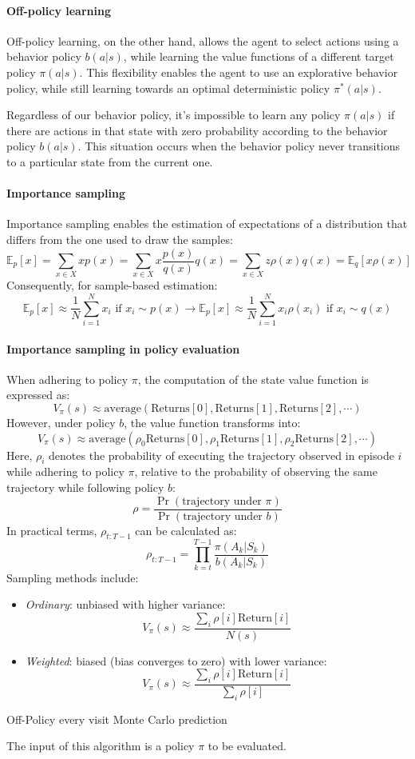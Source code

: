 \paragraph*{Off-policy learning}
Off-policy learning, on the other hand, allows the agent to select actions using a behavior policy $b(a|s)$, while learning the value functions of a different target policy $\pi(a|s)$. 
This flexibility enables the agent to use an explorative behavior policy, while still learning towards an optimal deterministic policy $\pi^\ast(a|s)$.

Regardless of our behavior policy, it's impossible to learn any policy $\pi(a|s)$ if there are actions in that state with zero probability according to the behavior policy $b(a|s)$. 
This situation occurs when the behavior policy never transitions to a particular state from the current one.

\paragraph*{Importance sampling}
Importance sampling enables the estimation of expectations of a distribution that differs from the one used to draw the samples:
\[\mathbb{E}_p[x]=\sum_{x\in X}xp(x)=\sum_{x\in X}x\dfrac{p(x)}{q(x)}q(x)=\sum_{x\in X}z\rho(x)q(x)=\mathbb{E}_q[x\rho(x)]\]
Consequently, for sample-based estimation:
\[\mathbb{E}_p[x]\approx\dfrac{1}{N}\sum_{i=1}^{N}x_i\text{ if }x_i\sim p(x)\rightarrow \mathbb{E}_p[x]\approx\dfrac{1}{N}\sum_{i=1}^{N}x_i\rho(x_i)\text{ if }x_i\sim q(x)\]

\paragraph*{Importance sampling in policy evaluation}
When adhering to policy $\pi$, the computation of the state value function is expressed as:
\[V_{\pi}(s)\approx\text{average}(\text{Returns}[0],\text{Returns}[1],\text{Returns}[2],\cdots)\]
However, under policy $b$, the value function transforms into:
\[V_{\pi}(s)\approx\text{average}(\rho_0\text{Returns}[0],\rho_1\text{Returns}[1],\rho_2\text{Returns}[2],\cdots)\]
Here, $\rho_i$ denotes the probability of executing the trajectory observed in episode $i$ while adhering to policy $\pi$, relative to the probability of observing the same trajectory while following policy $b$:
\[\rho=\dfrac{\Pr(\text{trajectory under }\pi)}{\Pr(\text{trajectory under }b)}\]
In practical terms, $\rho_{t:T-1}$ can be calculated as:
\[\rho_{t:T-1}=\prod_{k=t}^{T-1}\dfrac{\pi(A_k|S_k)}{b(A_k|S_k)}\]
Sampling methods include:
\begin{itemize}
    \item \textit{Ordinary}: unbiased with higher variance:
        \[V_{\pi}(s)\approx\dfrac{\sum_i\rho[i]\text{Return}[i]}{N(s)}\]
    \item \textit{Weighted}: biased (bias converges to zero) with lower variance:
    \[V_{\pi}(s)\approx\dfrac{\sum_i\rho[i]\text{Return}[i]}{\sum_i\rho[i]}\]
\end{itemize}

\begin{algorithm}[H]
    \caption{Off-Policy every visit Monte Carlo prediction}
        \begin{algorithmic}[1]
        \end{algorithmic}
\end{algorithm}
The input of this algorithm is a policy $\pi$ to be evaluated.